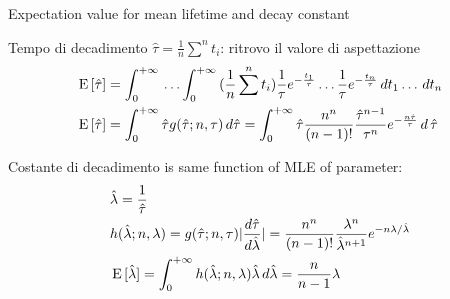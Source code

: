 \documentclass[asd-beamer.tex]{subfiles}
\begin{document}
\begin{frame}{Expectation value for mean lifetime and decay constant}
\begin{block}{Tempo di decadimento}
$\hat{\tau}=\frac{1}{n}\sum^nt_i$: ritrovo il valore di aspettazione
\begin{align*}
&\operatorname{E}{[\hat{\tau}]}=\int_{0}^{+\infty}{}\ldots\int_{0}^{+\infty}{}(\frac{1}{n}\sum^nt_i)\frac{1}{\tau}e^{-\frac{t_1}{\tau}}\ldots\frac{1}{\tau}e^{-\frac{t_n}{\tau}}\,dt_1\ldots\,dt_n\\
&\operatorname{E}{[\hat{\tau}]}=\int_{0}^{+\infty}{}\hat{\tau}g(\hat{\tau};n,\tau)\,d\hat{\tau}=\int_{0}^{+\infty}{}\hat{\tau}\frac{n^n}{(n-1)!}\frac{\hat{\tau}^{n-1}}{\tau^n}e^{-\frac{n\hat{\tau}}{\tau}}\,d\,\hat{\tau}
\end{align*}
\end{block}
\begin{block}{Costante di decadimento}
 is same function of MLE of parameter:
\begin{align*}
&\hat{\lambda}=\frac{1}{\hat{\tau}}\\
&h(\hat{\lambda};n,\lambda)=g(\hat{\tau};n,\tau)|\frac{d \hat{\tau}}{d \hat{\lambda}}|=\frac{n^n}{(n-1)!}\frac{\lambda^n}{\hat{\lambda}^{n+1}}e^{-n\lambda/\hat{\lambda}}\\
&\operatorname{E}{[\hat{\lambda}]}=\int_{0}^{+\infty}{}h(\hat{\lambda};n,\lambda)\hat{\lambda}\,d\hat{\lambda}=\frac{n}{n-1}\lambda
\end{align*}
\end{block}
\end{frame}
\end{document}
